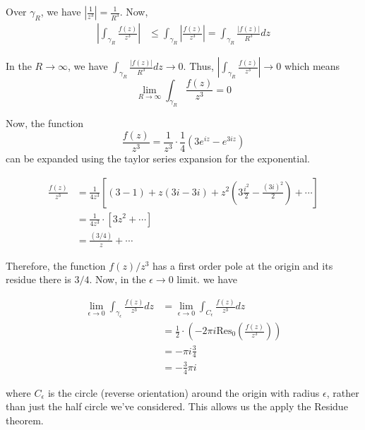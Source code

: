 \documentclass{article}
\begin{document}

\vskip 1cm
Over $\gamma_R$, we have $\left|\frac{1}{z^3}\right| = \frac{1}{R^3}$. Now, 
\begin{align*}
  \left| \int_{{\gamma_R}} \frac{f(z)}{z^3} \right| &\leq \int_{{\gamma_R}} \left| \frac{f(z)}{z^3} \right| = \int_{\gamma_R} \frac{\left|f(z)\right|}{R^3} dz
\end{align*}

\vskip 0.5cm
In the $R \rightarrow \infty$, we have $\int_{\gamma_R} \frac{\left|f(z)\right|}{R^3} dz \rightarrow 0$. Thus, $\left| \int_{{\gamma_R}} \frac{f(z)}{z^3} \right| \rightarrow 0$ which means
\[ \lim_{R \rightarrow \infty} \int_{{\gamma_R}} \frac{f(z)}{z^3} = 0 \]


\vskip 1cm
Now, the function 
\[ \frac{f(z)}{z^3} = \frac{1}{z^3} \cdot \frac{1}{4} \left( 3e^{iz} - e^{3iz} \right) \] can be expanded using the taylor series expansion for the exponential.

\begin{align*}
  \frac{f(z)}{z^3} &= \frac{1}{4z^3} \left[ (3-1) + z(3i - 3i) + z^2 \left( 3\frac{i^2}{2} - \frac{(3i)^2}{2} \right) + \cdots \right] \\
  &= \frac{1}{4z^3} \cdot \left[3z^2 + \cdots \right] \\
  &= \frac{(3/4)}{z} + \cdots
\end{align*}

Therefore,  the function $f(z)/z^3$ has a first order pole at the origin and its residue there is $3/4$. Now, in the $\epsilon \rightarrow 0$ limit. we have 

\begin{align*}
  \lim_{\epsilon \rightarrow 0} \int_{{\gamma_{\epsilon}}} \frac{f(z)}{z^3} dz &= \lim_{\epsilon \rightarrow 0} \int_{{C_\epsilon}} \frac{f(z)}{z^3} dz \\
  &= \frac{1}{2} \cdot \left( -2\pi i \text{Res}_{0}\left( \frac{f(z)}{z^3} \right) \right)\\
  &= -\pi i \frac{3}{4} \\
  &= -\frac{3}{4}\pi i 
\end{align*}

where $C_{\epsilon}$ is the circle (reverse orientation) around the origin with radius $\epsilon$, rather than just the half circle we've considered. This allows us the apply the Residue theorem.
\end{document}
